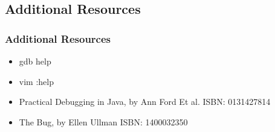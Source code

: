 \documentclass{beamer}
\begin{document}
\subsection{Additional Resources}
\frame
{
    \frametitle{Additional Resources}

    \begin{itemize}
        \item gdb help 
        \item vim :help 
        \item Practical Debugging in Java, by Ann Ford Et al.
             \linebreak\hspace{.2in}  ISBN: 0131427814
        \item The Bug, by Ellen Ullman
            \linebreak\hspace{.2in}  ISBN: 1400032350

    \end{itemize}
}
\end{document}
